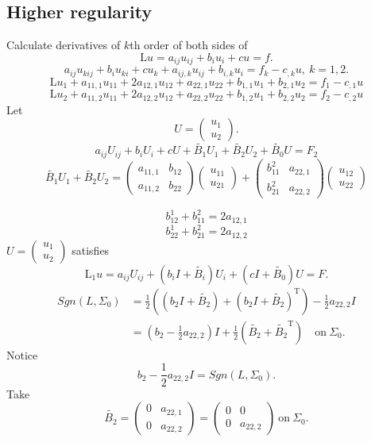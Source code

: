 \documentclass[12pt]{article}
\begin{document}
\subsection{Higher regularity}
Calculate derivatives of $k$th order of both sides of 
\[\mathrm{L}u=a_{ij}u_{ij}+b_iu_i+cu = f. \]
\[a_{ij}u_{kij}+b_iu_{ki}+cu_k+a_{ij,k}u_{ij}+b_{i,k}u_i=f_k-c_{,k}u,\ k=1,2. \]
\[\mathrm{L}u_1+a_{11,1}u_{11}+2a_{12,1}u_{12}+a_{22,1}u_{22}+b_{1,1}u_1+b_{2,1}u_2=f_1-c_{,1}u \]
\[\mathrm{L}u_2+a_{11,2}u_{11}+2a_{12,2}u_{12}+a_{22,2}u_{22}+b_{1,2}u_1+b_{2,2}u_2=f_2-c_{,2}u \]
Let
\[U=\left(\begin{array}{c}u_1\\u_2 \end{array}\right) .\]
\[a_{ij}U_{ij}+b_iU_i+cU+\tilde{B_1}U_1+\tilde{B_2}U_2+\tilde{B_0} U=F_2 \]
\[ 
\tilde{B_1}U_1+\tilde{B_2}U_2=
\left(
\begin{array}{cc}
a_{11,1}&b_{12}\\
a_{11,2}&b_{22}
\end{array}
\right)
\left(
\begin{array}{c}
u_{11}\\
u_{21}
\end{array}
\right)+
\left(
\begin{array}{cc}
b_{11}^2&a_{22,1}\\
b_{21}^2&a_{22,2}
\end{array}
\right)
\left(
\begin{array}{c}
u_{12}\\
u_{22}
\end{array}
\right)
\]

\[b_{12}^1+b_{11}^2=2a_{12,1} \]
\[b_{22}^1+b_{21}^2=2a_{12,2} \]
$U=\left(\begin{array}{c}u_1\\u_2\end{array}\right) $ satisfies
\[\mathrm{L_1}u = a_{ij}U_{ij}+\left(b_iI+\tilde{B_i}\right)U_i+\left(cI+\tilde{B_0}\right)U=F. \]
\begin{align*}
Sgn(L,\Sigma_0) &=\frac{1}{2} \left(\left(b_2I+\tilde{B_2}\right)+\left(b_2I+\tilde{B_2}\right)^{\mathrm{T}}\right)-\frac{1}{2}a_{22,2}I\\
&=\left(b_2-\frac{1}{2}a_{22,2}\right)I+\frac{1}{2}\left(\tilde{B_2}+\tilde{B_2}^\mathrm{T}\right) \quad \mathrm{on\ }\Sigma_0.
\end{align*}
Notice 
\[b_2-\frac{1}{2}a_{22,2}I=Sgn(L,\Sigma_0). \]
Take
\[ 
\tilde{B_2}=\left(\begin{array}{cc}0&a_{22,1}\\0&a_{22,2} \end{array} \right)
=\left(\begin{array}{cc}0&0\\0&a_{22,2} \end{array} \right)\ \mathrm{on\ }\Sigma_0.
\]
\end{document}
